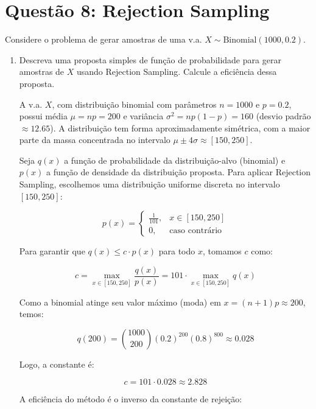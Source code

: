 \documentclass[12 pt]{article}
\begin{document}
\section*{Questão 8: Rejection Sampling}

Considere o problema de gerar amostras de uma v.a. $X \sim \text{Binomial}(1000, 0.2)$.

\begin{enumerate}
    \item Descreva uma proposta simples de função de probabilidade para gerar amostras de $X$ usando Rejection Sampling. Calcule a eficiência dessa proposta.
    \begin{tcolorbox}[colframe=black, title=Resposta:]
        A v.a. $X$, com distribuição binomial com parâmetros $n = 1000$ e $p = 0.2$, possui média $\mu = np = 200$ e variância $\sigma^2 = np(1 - p) = 160$ (desvio padrão $\approx 12.65$). A distribuição tem forma aproximadamente simétrica, com a maior parte da massa concentrada no intervalo $\mu \pm 4\sigma \approx [150, 250]$.
        
        Seja $q(x)$ a função de probabilidade da distribuição-alvo (binomial) e $p(x)$ a função de densidade da distribuição proposta. Para aplicar Rejection Sampling, escolhemos uma distribuição uniforme discreta no intervalo $[150, 250]$:
        
        $$
        p(x) = \begin{cases}
        \frac{1}{101}, & x \in [150, 250] \\
        0, & \text{caso contrário}
        \end{cases}
        $$
        
        Para garantir que $q(x) \leq c \cdot p(x)$ para todo $x$, tomamos $c$ como:
        
        $$
        c = \max_{x \in [150, 250]} \frac{q(x)}{p(x)} = 101 \cdot \max_{x \in [150, 250]} q(x)
        $$
        
        Como a binomial atinge seu valor máximo (moda) em $x = (n+1)p  \approx 200$, temos:
        
        $$
        q(200) = \binom{1000}{200} (0.2)^{200} (0.8)^{800} \approx 0.028
        $$
        
        Logo, a constante é:
        
        $$
        c = 101 \cdot 0.028 \approx 2.828
        $$
        
        A eficiência do método é o inverso da constante de rejeição:
        

\end{tcolorbox}
\end{enumerate}
\end{document}
